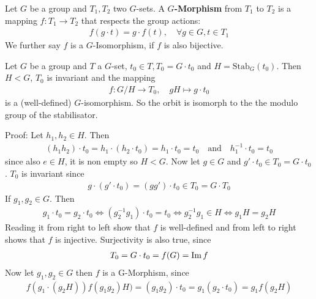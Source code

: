 \begin{definition}[]
	Let $G$ be a group and $T_1, T_2$ two $G$-sets. A \textbf{$G$-Morphism} from $T_1$ to $T_2$ is a mapping $f: T_1 \to T_2$ that respects the group actions:
	\begin{align*}
		f(g \cdot t) = g \cdot f(t), \quad \forall g \in G, t\in T_1	
	\end{align*}
	We further say $f$ is a $G$-Isomorphism, if $f$ is also bijective.
\end{definition}

\begin{theorem}[]
	Let $G$ be a group and $T$ a $G$-set, $t_0 \in T, T_0 = G \cdot t_0$ and $H = \text{Stab}_G(t_0)$. Then $H < G$, $T_0$ is invariant and the mapping
	\begin{align*}
			f: G/H \to T_0, \quad gH \mapsto g \cdot t_0	
	\end{align*}
	is a (well-defined) $G$-isomorphism. So the orbit is isomorph to the the modulo group of the stabilisator.
\end{theorem}
Proof: Let $h_1, h_2 \in H$. Then 
\begin{align*}
	(h_1h_2) \cdot t_0 = h_1 \cdot (h_2 \cdot t_0) = h_1 \cdot t_0 = t_0 \quad \text{and} \quad h_1^{-1} \cdot t_0 = t_0
\end{align*}
since also $e \in H$, it is non empty so $H < G$. Now let $g \in G$ and $g' \cdot t_0 \in T_0 = G \cdot t_0$. $T_0$ is invariant since
\begin{align*}
	g \cdot (g' \cdot t_0) = (gg') \cdot t_0 \in T_0 = G \cdot T_0
\end{align*}
If $g_1,g_2 \in G$. Then
\begin{align*}
	g_1 \cdot t_0 = g_2 \cdot t_0 \iff (g_2^{-1}g_1) \cdot t_0 = t_0 \iff g_2^{-1}g_1 \in H \iff g_1H = g_2H
\end{align*}
Reading it from right to left show that $f$ is well-defined and from left to right shows that $f$ is injective. Surjectivity is also true, since
\begin{align*}
	T_0 = G \cdot t_0 = f(G) = \operatorname{Im} f
\end{align*}
Now let $g_1,g_2 \in G$ then $f$ is a G-Morphism, since
\begin{align*}
	f(g_1 \cdot(g_2 H)) f(g_1g_2)H) = (g_1g_2) \cdot t_0 = g_1(g_2 \cdot t_0) = g_1 f(g_2H)
\end{align*}

